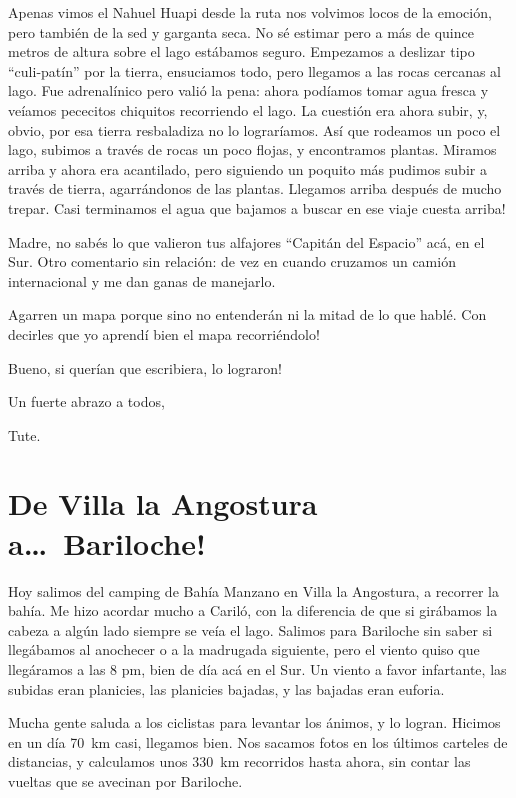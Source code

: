 Apenas vimos el Nahuel Huapi desde la ruta nos volvimos locos de la emoci\'on,
pero tambi\'en de la sed y garganta seca. No s\'e estimar pero a m\'as de quince
metros de altura sobre el lago est\'abamos seguro. Empezamos a deslizar tipo
``culi-pat\'in'' por la tierra, ensuciamos todo, pero llegamos a las rocas
cercanas al lago. Fue adrenal\'inico pero vali\'o la pena: ahora pod\'iamos
tomar agua fresca y ve\'iamos pececitos chiquitos recorriendo el lago. La
cuesti\'on era ahora subir, y, obvio, por esa tierra resbaladiza no lo
lograr\'iamos. As\'i que rodeamos un poco el lago, subimos a trav\'es de rocas
un poco flojas, y encontramos plantas. Miramos arriba y ahora era acantilado,
pero siguiendo un poquito m\'as pudimos subir a trav\'es de tierra,
agarr\'andonos de las plantas. Llegamos arriba despu\'es de mucho trepar.
\textexclamdown Casi terminamos el agua que bajamos a buscar en ese viaje cuesta
arriba!

Madre, no sab\'es lo que valieron tus alfajores ``Capit\'an del Espacio'' ac\'a,
en el Sur. Otro comentario sin relaci\'on: de vez en cuando cruzamos un cami\'on
internacional y me dan ganas de manejarlo.

Agarren un mapa porque sino no entender\'an ni la mitad de lo que habl\'e.
\textexclamdown Con decirles que yo aprend\'i bien el mapa recorri\'endolo!

Bueno, si quer\'ian que escribiera, \textexclamdown lo lograron!

Un fuerte abrazo a todos,

Tute.

\section{De Villa la Angostura a\ldots\ \textexclamdown Bariloche!}

Hoy salimos del camping de Bah\'ia Manzano en Villa la Angostura, a recorrer la
bah\'ia. Me hizo acordar mucho a Caril\'o, con la diferencia de que si
gir\'abamos la cabeza a alg\'un lado siempre se ve\'ia el lago. Salimos para
Bariloche sin saber si lleg\'abamos al anochecer o a la madrugada siguiente,
pero el viento quiso que lleg\'aramos a las 8 pm, bien de d\'ia ac\'a en el Sur.
Un viento a favor infartante, las subidas eran planicies, las planicies bajadas,
y las bajadas eran euforia.

Mucha gente saluda a los ciclistas para levantar los \'animos, y lo logran.
Hicimos en un d\'ia 70~km casi, llegamos bien. Nos sacamos fotos en los
\'ultimos carteles de distancias, y calculamos unos 330~km recorridos hasta
ahora, sin contar las vueltas que se avecinan por Bariloche.

